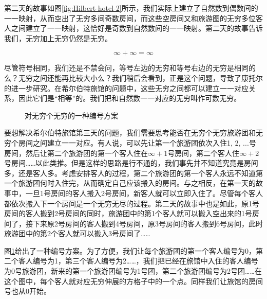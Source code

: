 \documentclass{article}
\begin{document}
第二天的故事如图\ref{fig:Hilbert-hotel-2}所示，我们实际上建立了自然数到偶数间的一一映射，从而空出了无穷多间奇数房间，而这些空房间又和旅游图的无穷多位客人之间建立了一一映射，这恰好是奇数到自然数间的一一映射。第二天的故事告诉我们，无穷加上无穷仍然是无穷。

\[
\infty + \infty = \infty
\]

尽管符号相同，我们还是不禁会问，等号左边的无穷和等号右边的无穷是相同的么？无穷之间还能再比较大小么？我们稍后会看到，正是这个问题，导致了康托尔的进一步研究。在希尔伯特旅馆的问题中，这些无穷之间都可以建立一一对应关系，因此它们是“相等”的。我们把和自然数一一对应的无穷叫作可数无穷。

\begin{figure}[htbp]
\centering
{}
\caption{对无穷个无穷的一种编号方案}
\label{fig:NNtoN}
\end{figure}

要想解决希尔伯特旅馆第三天的问题，我们需要思考能否在无穷个无穷旅游团和无穷个房间之间建立一一对应。有人说，可以先让第一个旅游团依次入住1, 2, ...号房间，然后让第二个旅游团的第一个客人住在$\infty + 1$号房间，第二个客人住$\infty + 2$号房间……以此类推。但是这样的思路是行不通的，我们事先并不知道究竟是房间多，还是客人多。考虑安排客人的过程，第二个旅游团的第一个客人永远不知道第一个旅游团何时入住完，从而确定自己应该搬入的房间。与之相反，在第一天的故事中，一旦1号房间的客人搬入2号房间，新客人就可以立即入住了。尽管每个客人都依次搬入下一个房间是一个无穷无尽的过程。第二天的故事中也是如此，原1号房间的客人搬到2号房间的同时，旅游团中的第1个客人就可以搬入空出来的1号房间了，接下来原2号房间的客人搬到4号房间，原3号房间的客人搬到6号房间，此时旅游团中的第2个客人就可以搬入3号房间了……

图\ref{fig:NNtoN}给出了一种编号方案。为了方便，我们让每个旅游团的第一个客人编号为0，第二个客人编号为1，第三个客人编号为2……，我们把已经在旅馆中入住的客人编号为0号旅游团，新来的第一个旅游团编号为1号团，第二个旅游团编号为2号团……在这个图中，每个客人就对应无穷伸展的方格子中的一个点。同样我们让旅馆的房间号也从0开始。
\end{document}
